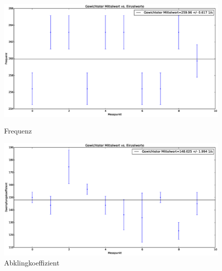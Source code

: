 \documentclass[12pt,a4paper]{article}
\begin{document}
\begin{figure}[H]
\caption{Frequenz}
\centering
\includegraphics[scale=0.3]{Bilder/FrequenzGewichtet.eps}
\label{Frequenz_Oszi}
\end{figure}

\begin{figure}[H]
\caption{Abklingkoeffizient}
\centering
\includegraphics[scale=0.3]{Bilder/DaempfungGewichtet.eps}
\end{figure}
\end{document}
